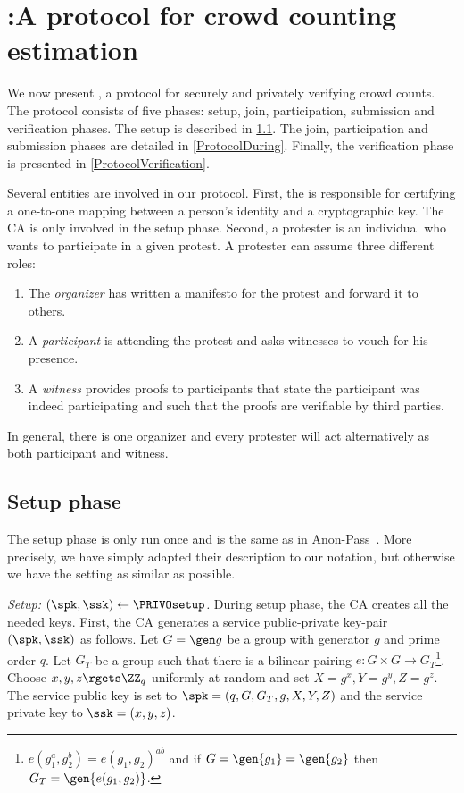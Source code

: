 \section{\PRIVO:\@ A protocol for crowd counting estimation}%
\label{Protocol}


We now present \PRIVO, a protocol for securely and privately verifying crowd counts.
The protocol consists of five phases: setup, join, participation, submission and verification phases.
The setup is described in \cref{ProtocolSetup}.
The join, participation and submission phases are detailed in \cref{ProtocolDuring}.
Finally, the verification phase is presented in \cref{ProtocolVerification}.

Several entities are involved in our protocol.
First, the  is responsible for certifying a one-to-one mapping between a person's identity and a cryptographic key.
The \ac{CA} is only involved in the setup phase.
Second, a protester is an individual who wants to participate in a given protest.
A protester can assume three different roles:
\begin{enumerate}
\item The \emph{organizer} has written a manifesto for the protest and forward it to others.
\item A \emph{participant} is attending the protest and asks witnesses to vouch for his presence.
\item A \emph{witness} provides proofs to participants that state the participant was indeed participating and such that the proofs are verifiable by third parties.
\end{enumerate}
In general, there is one organizer and every protester will act alternatively as both participant and witness.

\subsection{Setup phase}%
\label{ProtocolSetup}

The setup phase is only run once and is the same as in Anon-Pass~\cite{AnonPass}.
More precisely, we have simply adapted their description to our notation, but otherwise we have the setting as similar as possible.


\emph{Setup: \((\spk, \ssk)\gets \PRIVOsetup\).}
During setup phase, the \ac{CA} creates all the needed keys.
First, the \ac{CA} generates a service public-private key-pair \((\spk, \ssk)\) as follows.
Let \(G = \gen g\) be a group with generator \(g\) and prime order \(q\).
Let \(G_T\) be a group such that there is a bilinear pairing \(e\colon G\times G\to G_T\)\footnote{%
  \Ie \(e(g_1^a, g_2^b) = e(g_1, g_2)^{ab}\) and if \(G = \gen{g_1} = 
    \gen{g_2}\) then \(G_T = \gen{e(g_1, g_2)}\).
}.
Choose \(x,y,z\rgets \ZZ_q\) uniformly at random and set \(X = g^x, Y = g^y, Z = g^z\).
The service public key is set to \(\spk = (q, G, G_T, g, X, Y, Z)\) and the service private key to \(\ssk = (x, y, z)\).


